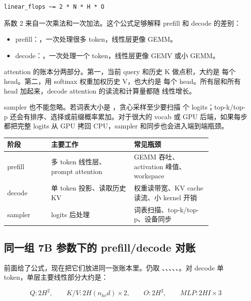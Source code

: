 \begin{lstlisting}[numbers=none,caption={线性层 FLOPs 粗账}]
linear_flops ~= 2 * N * H * O
\end{lstlisting}

系数 2 来自一次乘法和一次加法。这个公式足够解释 prefill 和 decode 的差别：

\begin{itemize}
  \item prefill：，一次处理很多 token，线性层更像 GEMM。
  \item decode：，一次处理一个 token，线性层更像 GEMV 或小 GEMM。
\end{itemize}

attention 的账本分两部分。第一，当前 query 和历史 K 做点积，大约是  每个 head。第二，用 softmax 权重加权历史 V，也大约是  每个 head。所有层和所有 head 加起来，decode attention 的读流和计算量都随  线性增长。

sampler 也不能忽略。若词表大小是 ，贪心采样至少要扫描  个 logits；top-k/top-p 还会有排序、选择或前缀概率累加。对于很大的 vocab 或 GPU 后端，如果每步都把完整 logits 从 GPU 拷回 CPU，sampler 和同步也会进入端到端瓶颈。

\begin{center}
\begin{tabular}{p{0.18\linewidth}p{0.34\linewidth}p{0.32\linewidth}}
\toprule
阶段 & 主要工作 & 常见瓶颈 \\
\midrule
prefill & 多 token 线性层、prompt attention & GEMM 吞吐、activation 峰值、workspace \\
decode & 单 token 投影、读取历史 KV & 权重读带宽、KV cache 读流、小 kernel 开销 \\
sampler & logits 后处理 & 词表扫描、top-k/top-p、设备同步 \\
\bottomrule
\end{tabular}
\end{center}

\subsection{同一组 7B 参数下的 prefill/decode 对账}

前面给了公式，现在把它们放进同一张账本里。仍取 、、、、、。对 decode 单 token，单层主要线性部分大约是：

\[
Q: 2H^2,\qquad
K/V: 2H(n_{kv}d)\times 2,\qquad
O: 2H^2,\qquad
MLP: 2HI\times 3
\]

